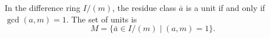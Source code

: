 In the difference ring $I/(m)$, the residue class $\bar{a}$ is a unit if and only if $\gcd(a, m) = 1$. The set of units is
$$M = \{\bar{a} \in I/(m) \mid (a, m) = 1\}.$$
